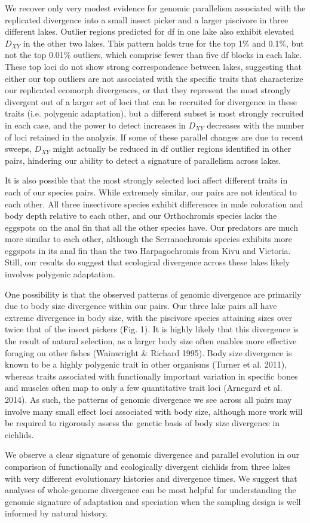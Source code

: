 We recover only very modest evidence for genomic parallelism associated with the replicated divergence into a small insect picker and a larger piscivore in three different lakes. Outlier regions predicted for df in one lake also exhibit elevated $D_{XY}$ in the other two lakes. This pattern holds true for the top 1\% and 0.1\%, but not the top 0.01\% outliers, which comprise fewer than five df blocks in each lake. These top loci do not show strong correspondence between lakes, suggesting that either our top outliers are not associated with the specific traits that characterize our replicated ecomorph divergences, or that they represent the most strongly divergent out of a larger set of loci that can be recruited for divergence in these traits (i.e. polygenic adaptation), but a different subset is most strongly recruited in each case, and the power to detect increases in $D_{XY}$ decreases with the number of loci retained in the analysis. If some of these parallel changes are due to recent sweeps, $D_{XY}$ might actually be reduced in df outlier regions identified in other pairs, hindering our ability to detect a signature of parallelism across lakes.

It is also possible that the most strongly selected loci affect different traits in each of our species pairs. While extremely similar, our pairs are not identical to each other. All three insectivore species exhibit differences in male coloration and body depth relative to each other, and our Orthochromis species lacks the eggspots on the anal fin that all the other species have. Our predators are much more similar to each other, although the Serranochromis species exhibits more eggspots in its anal fin than the two Harpagochromis from Kivu and Victoria. Still, our results do suggest that ecological divergence across these lakes likely involves polygenic adaptation.

One possibility is that the observed patterns of genomic divergence are primarily due to body size divergence within our pairs. Our three lake pairs all have extreme divergence in body size, with the piscivore species attaining sizes over twice that of the insect pickers (Fig. 1). It is highly likely that this divergence is the result of natural selection, as a larger body size often enables more effective foraging on other fishes (Wainwright \& Richard 1995). Body size divergence is known to be a highly polygenic trait in other organisms (Turner et al. 2011), whereas traits associated with functionally important variation in specific bones and muscles often map to only a few quantitative trait loci (Arnegard et al. 2014). As such, the patterns of genomic divergence we see across all pairs may involve many small effect loci associated with body size, although more work will be required to rigorously assess the genetic basis of body size divergence in cichlids.

We observe a clear signature of genomic divergence and parallel evolution in our comparison of functionally and ecologically divergent cichlids from three lakes with very different evolutionary histories and divergence times. We suggest that analyses of whole-genome divergence can be most helpful for understanding the genomic signature of adaptation and speciation when the sampling design is well informed by natural history.